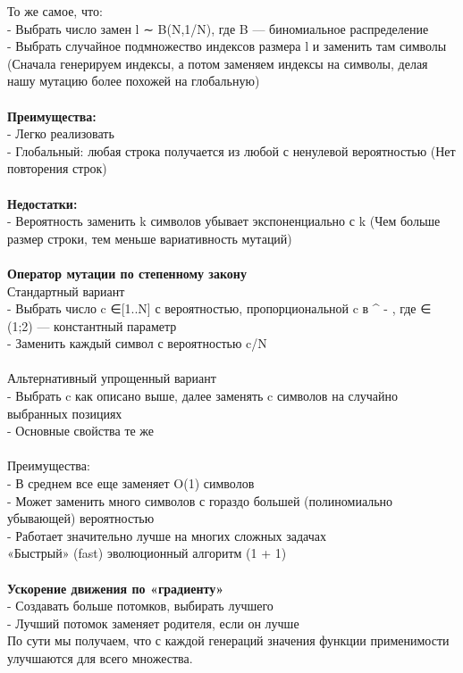 То же самое, что: \\
- Выбрать число замен l ∼ B(N,1/N), где B — биномиальное распределение  \\
- Выбрать случайное подмножество индексов размера l и заменить там символы (Сначала генерируем индексы, а потом заменяем индексы на символы, делая нашу мутацию более похожей на глобальную)\\
\\
\textbf{Преимущества: \\}
 - Легко реализовать \\
 - Глобальный: любая строка получается из любой с ненулевой вероятностью (Нет повторения строк) \\
\\
\textbf{Недостатки: \\}
 - Вероятность заменить k символов убывает экспоненциально с k (Чем больше размер строки, тем меньше вариативность мутаций)\\
\\
\textbf{Оператор мутации по степенному закону \\}
Стандартный вариант \\
- Выбрать число c ∈[1..N] с вероятностью, пропорциональной c в ^ {- \beta} , где \beta ∈ (1;2) — константный параметр \\
- Заменить каждый символ с вероятностью c/N\\ 
\\
Альтернативный  упрощенный  вариант \\
- Выбрать c как описано выше, далее заменять c символов на случайно выбранных позициях \\
- Основные свойства те же \\
\\
Преимущества: \\
- В среднем все еще заменяет O(1) символов\\
- Может заменить много символов с гораздо большей (полиномиально убывающей) вероятностью \\
- Работает значительно лучше на многих сложных задачах \\
«Быстрый» (fast) эволюционный алгоритм (1 + 1)\\
\\
\textbf{Ускорение движения по «градиенту»} \\
- Создавать больше потомков, выбирать лучшего \\
- Лучший потомок заменяет родителя, если он лучше \\
По сути мы получаем, что с каждой генераций значения функции применимости улучшаются для всего множества. \\
